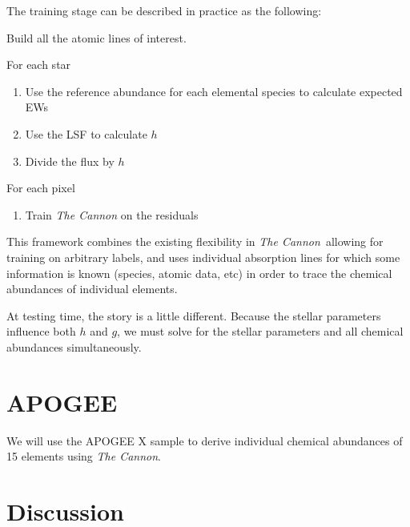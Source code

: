 \documentclass[useAMS,usenatbib]{mn2e}
\newcommand\tc{\textit{The Cannon}}
\begin{document}
The training stage can be described in practice as the following:

Build all the atomic lines of interest.

For each star
\begin{enumerate}
\item Use the reference abundance for each elemental species to calculate expected EWs
\item Use the LSF to calculate $h$
\item Divide the flux by $h$
\end{enumerate}

For each pixel
\begin{enumerate}
\item Train \tc{} on the residuals
\end{enumerate}

This framework combines the existing flexibility in \tc\, allowing for training
on arbitrary labels, and uses individual absorption lines for which some 
information is known (species, atomic data, etc) in order to trace the chemical 
abundances of individual elements.

At testing time, the story is a little different. Because the stellar parameters
influence both $h$ and $g$, we must solve for the stellar parameters and all
chemical abundances simultaneously.


\section{APOGEE}

We will use the APOGEE X sample to derive individual chemical abundances of 15
elements using \tc{}. 





\section{Discussion}


\end{document}
